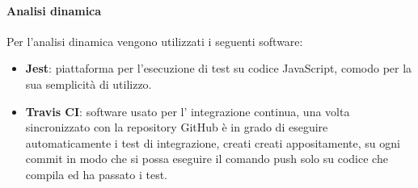 			\paragraph{Analisi dinamica} \Spazio
			Per l'analisi dinamica vengono utilizzati i seguenti software:
			\begin{itemize}
				\item  \textbf{Jest}: piattaforma per l'esecuzione di test su codice JavaScript, comodo per la sua semplicità di utilizzo.
				\item \textbf{Travis CI}: software usato per l' integrazione continua, una volta sincronizzato con la repository GitHub è in grado di eseguire automaticamente i test di integrazione, creati creati appositamente, su ogni commit in modo che si possa eseguire il comando push solo su codice che compila ed ha passato i test.
			\end{itemize}
